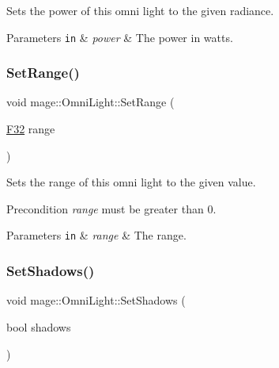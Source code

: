 Sets the power of this omni light to the given radiance.


\begin{DoxyParams}[1]{Parameters}
\mbox{\tt in}  & {\em power} & The power in watts. \\
\hline
\end{DoxyParams}
\hypertarget{classmage_1_1_omni_light_a696ec6a022ccc3993d88c1d435938fb1}{}\label{classmage_1_1_omni_light_a696ec6a022ccc3993d88c1d435938fb1} 
\subsubsection{\texorpdfstring{Set\+Range()}{SetRange()}}
{\footnotesize\ttfamily void mage\+::\+Omni\+Light\+::\+Set\+Range (\begin{DoxyParamCaption}\item[{\hyperlink{namespacemage_aa97e833b45f06d60a0a9c4fc22ae02c0}{F32}}]{range }\end{DoxyParamCaption})\hspace{0.3cm}{\ttfamily [noexcept]}}

Sets the range of this omni light to the given value.

\begin{DoxyPrecond}{Precondition}
{\itshape range} must be greater than 0. 
\end{DoxyPrecond}

\begin{DoxyParams}[1]{Parameters}
\mbox{\tt in}  & {\em range} & The range. \\
\hline
\end{DoxyParams}
\hypertarget{classmage_1_1_omni_light_a337082a4e6026fe6f98098df063e6660}{}\label{classmage_1_1_omni_light_a337082a4e6026fe6f98098df063e6660} 
\subsubsection{\texorpdfstring{Set\+Shadows()}{SetShadows()}}
{\footnotesize\ttfamily void mage\+::\+Omni\+Light\+::\+Set\+Shadows (\begin{DoxyParamCaption}\item[{bool}]{shadows }\end{DoxyParamCaption})\hspace{0.3cm}{\ttfamily [noexcept]}}

